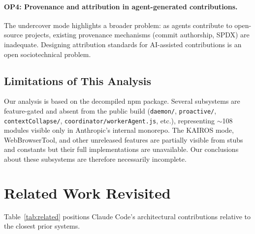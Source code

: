 \documentclass{article}
\newcommand{\code}[1]{\texttt{#1}}
\begin{document}
\paragraph{OP4: Provenance and attribution in agent-generated contributions.}
The undercover mode highlights a broader problem: as agents contribute to open-source projects, existing provenance mechanisms (commit authorship, SPDX) are inadequate. Designing attribution standards for AI-assisted contributions is an open sociotechnical problem.

\subsection{Limitations of This Analysis}

Our analysis is based on the decompiled npm package. Several subsystems are feature-gated and absent from the public build (\code{daemon/}, \code{proactive/}, \code{contextCollapse/}, \code{coordinator/workerAgent.js}, etc.), representing $\sim$108 modules visible only in Anthropic's internal monorepo. The KAIROS mode, WebBrowserTool, and other unreleased features are partially visible from stubs and constants but their full implementations are unavailable. Our conclusions about these subsystems are therefore necessarily incomplete.

\section{Related Work Revisited}

Table~\ref{tab:related} positions Claude Code's architectural contributions relative to the closest prior systems.
\end{document}
